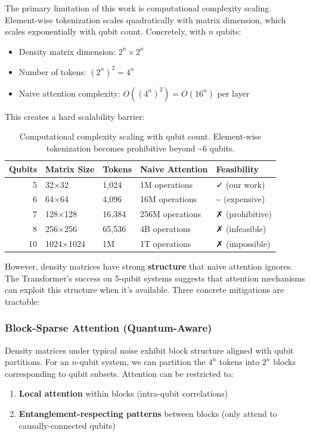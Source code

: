 \documentclass[11pt]{article}
\begin{document}
The primary limitation of this work is computational complexity scaling. Element-wise tokenization scales quadratically with matrix dimension, which scales exponentially with qubit count. Concretely, with \(n\) qubits:

\begin{itemize}
\item Density matrix dimension: \(2^n \times 2^n\)
\item Number of tokens: \((2^n)^2 = 4^n\)
\item Naive attention complexity: \(O((4^n)^2) = O(16^n)\) per layer
\end{itemize}

This creates a hard scalability barrier:

\begin{table}[htbp]
\caption{\label{tab:org7e807eb}Computational complexity scaling with qubit count. Element-wise tokenization becomes prohibitive beyond \textasciitilde{}6 qubits.}
\centering
\begin{tabular}{rllll}
Qubits & Matrix Size & Tokens & Naive Attention & Feasibility\\
\hline
5 & 32×32 & 1,024 & 1M operations & ✓ (our work)\\
6 & 64×64 & 4,096 & 16M operations & \textasciitilde{} (expensive)\\
7 & 128×128 & 16,384 & 256M operations & ✗ (prohibitive)\\
8 & 256×256 & 65,536 & 4B operations & ✗ (infeasible)\\
10 & 1024×1024 & 1M & 1T operations & ✗ (impossible)\\
\end{tabular}
\end{table}

However, density matrices have strong \textbf{structure} that naive attention ignores. The Transformer's success on 5-qubit systems suggests that attention mechanisms can exploit this structure when it's available. Three concrete mitigations are tractable:
\subsubsection{Block-Sparse Attention (Quantum-Aware)}
\label{sec:org67e48b9}

Density matrices under typical noise exhibit block structure aligned with qubit partitions. For an \(n\)-qubit system, we can partition the \(4^n\) tokens into \(2^n\) blocks corresponding to qubit subsets. Attention can be restricted to:
\begin{enumerate}
\item \textbf{Local attention} within blocks (intra-qubit correlations)
\item \textbf{Entanglement-respecting patterns} between blocks (only attend to causally-connected qubits)
\end{enumerate}
\end{document}
